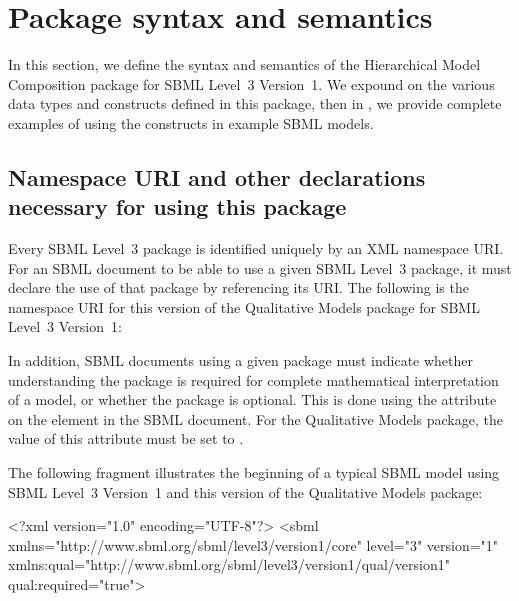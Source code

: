 
\newcommand{\fixttspace}{\hspace*{1pt}}

\section{Package syntax and semantics}

In this section, we define the syntax and semantics of the Hierarchical
Model Composition package for SBML Level~3 Version~1.  We expound on the
various data types and constructs defined in this package, then in
, we provide complete examples of using the constructs in
example SBML models.

\subsection{Namespace URI and other declarations necessary for using this package}
\label{xml-namespace}

Every SBML Level~3 package is identified uniquely by an XML namespace
URI.  For an SBML document to be able to use a given SBML Level~3
package, it must declare the use of that package by referencing its URI.
The following is the namespace URI for this version of the Qualitative Models package for SBML Level~3 Version~1:
\begin{center}
\end{center}

In addition, SBML documents using a given package must indicate whether
understanding the package is required for complete mathematical
interpretation of a model, or whether the package is optional.  This is
done using the attribute  on the  element
in the SBML document.  For the Qualitative Models package,
the value of this attribute must be set to .

The following fragment illustrates the beginning of a typical SBML model
using SBML Level~3 Version~1 and this version of the Qualitative Models package:

\begin{example}
<?xml version="1.0" encoding="UTF-8"?>
<sbml xmlns="http://www.sbml.org/sbml/level3/version1/core" level="3" version="1"
      xmlns:qual="http://www.sbml.org/sbml/level3/version1/qual/version1" qual:required="true">
\end{example}
    

